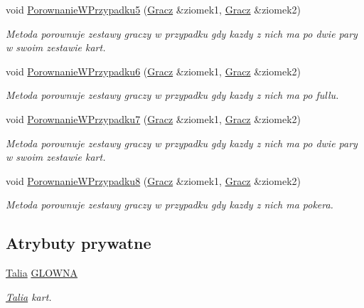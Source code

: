 \begin{DoxyCompactItemize}
void \hyperlink{class_g_r_a_abd74a787e23a77dc6ccccece977ceef0}{Porownanie\-W\-Przypadku5} (\hyperlink{class_gracz}{Gracz} \&ziomek1, \hyperlink{class_gracz}{Gracz} \&ziomek2)
\begin{DoxyCompactList}\small\item\em Metoda porownuje zestawy graczy w przypadku gdy kazdy z nich ma po dwie pary w swoim zestawie kart. \end{DoxyCompactList}\item 
void \hyperlink{class_g_r_a_a58fe652c31046c129a81ec7d3f8755d0}{Porownanie\-W\-Przypadku6} (\hyperlink{class_gracz}{Gracz} \&ziomek1, \hyperlink{class_gracz}{Gracz} \&ziomek2)
\begin{DoxyCompactList}\small\item\em Metoda porownuje zestawy graczy w przypadku gdy kazdy z nich ma po fullu. \end{DoxyCompactList}\item 
void \hyperlink{class_g_r_a_a4a73ac7324002fe6f1d1c49cc447527e}{Porownanie\-W\-Przypadku7} (\hyperlink{class_gracz}{Gracz} \&ziomek1, \hyperlink{class_gracz}{Gracz} \&ziomek2)
\begin{DoxyCompactList}\small\item\em Metoda porownuje zestawy graczy w przypadku gdy kazdy z nich ma po dwie pary w swoim zestawie kart. \end{DoxyCompactList}\item 
void \hyperlink{class_g_r_a_a08ecbfc2389ce156e7e4cbb7a4bfbbcb}{Porownanie\-W\-Przypadku8} (\hyperlink{class_gracz}{Gracz} \&ziomek1, \hyperlink{class_gracz}{Gracz} \&ziomek2)
\begin{DoxyCompactList}\small\item\em Metoda porownuje zestawy graczy w przypadku gdy kazdy z nich ma pokera. \end{DoxyCompactList}\end{DoxyCompactItemize}
\subsection*{Atrybuty prywatne}
\begin{DoxyCompactItemize}
\item 
\hyperlink{class_talia}{Talia} \hyperlink{class_g_r_a_a0432480fcbb139f19b413a1bd627b9ce}{G\-L\-O\-W\-N\-A}
\begin{DoxyCompactList}\small\item\em \hyperlink{class_talia}{Talia} kart. \end{DoxyCompactList}\end{DoxyCompactItemize}


